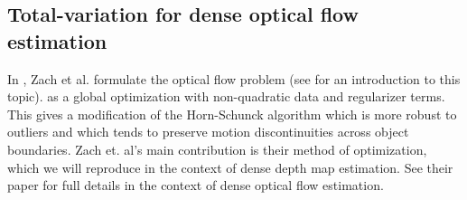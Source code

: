 \documentclass[conference]{IEEEtran}
\begin{document}

\subsection{Total-variation for dense optical flow estimation}
In \cite{tv_optical_flow}, Zach et al. formulate the optical flow problem (see \cite{szeliski} for an introduction to this topic).
as a global optimization with non-quadratic data and regularizer terms. This gives a modification
of the Horn-Schunck algorithm which is more robust to outliers and which tends to preserve motion discontinuities across object boundaries.
Zach et. al's main contribution is their method of optimization,
which we will reproduce in the context of dense depth map estimation.
See their paper \cite{tv_optical_flow} for full details in the context of dense optical flow estimation.
\end{document}
